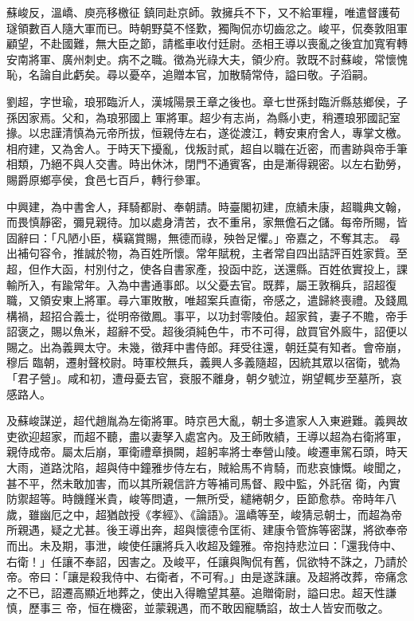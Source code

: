 \begin{pinyinscope}
 蘇峻反，溫嶠、庾亮移檄征
 鎮同赴京師。敦擁兵不下，又不給軍糧，唯遣督護荀璲領數百人隨大軍而已。時朝野莫不怪歎，獨陶侃亦切齒忿之。峻平，侃奏敦阻軍顧望，不赴國難，無大臣之節，請檻車收付廷尉。丞相王導以喪亂之後宜加寬宥轉安南將軍、廣州刺史。病不之職。徵為光祿大夫，領少府。敦既不討蘇峻，常懷愧恥，名論自此虧矣。尋以憂卒，追贈本官，加散騎常侍，謚曰敬。子滔嗣。



 劉超，字世瑜，琅邪臨沂人，漢城陽景王章之後也。章七世孫封臨沂縣慈鄉侯，子孫因家焉。父和，為琅邪國上
 軍將軍。超少有志尚，為縣小吏，稍遷琅邪國記室掾。以忠謹清慎為元帝所拔，恒親侍左右，遂從渡江，轉安東府舍人，專掌文檄。相府建，又為舍人。于時天下擾亂，伐叛討貳，超自以職在近密，而書跡與帝手筆相類，乃絕不與人交書。時出休沐，閉門不通賓客，由是漸得親密。以左右勤勞，賜爵原鄉亭侯，食邑七百戶，轉行參軍。



 中興建，為中書舍人，拜騎都尉、奉朝請。時臺閣初建，庶績未康，超職典文翰，而畏慎靜密，彌見親待。加以處身清苦，衣不重帛，家無儋石之儲。每帝所賜，皆固辭曰：「凡陋小臣，橫竊賞賜，無德而祿，殃咎足懼。」帝嘉之，不奪其志。
 尋出補句容令，推誠於物，為百姓所懷。常年賦稅，主者常自四出詰評百姓家貲。至超，但作大函，村別付之，使各自書家產，投函中訖，送還縣。百姓依實投上，課輸所入，有踰常年。入為中書通事郎。以父憂去官。既葬，屬王敦稱兵，詔超復職，又領安東上將軍。尋六軍敗散，唯超案兵直衛，帝感之，遣歸終喪禮。及錢鳳構禍，超招合義士，從明帝徵鳳。事平，以功封零陵伯。超家貧，妻子不贍，帝手詔褒之，賜以魚米，超辭不受。超後須純色牛，市不可得，啟買官外廄牛，詔便以賜之。出為義興太守。未幾，徵拜中書侍郎。拜受往還，朝廷莫有知者。會帝崩，穆后
 臨朝，遷射聲校尉。時軍校無兵，義興人多義隨超，因統其眾以宿衛，號為「君子營」。咸和初，遭母憂去官，衰服不離身，朝夕號泣，朔望輒步至墓所，哀感路人。



 及蘇峻謀逆，超代趙胤為左衛將軍。時京邑大亂，朝士多遣家人入東避難。義興故吏欲迎超家，而超不聽，盡以妻孥入處宮內。及王師敗績，王導以超為右衛將軍，親侍成帝。屬太后崩，軍衛禮章損闕，超躬率將士奉營山陵。峻遷車駕石頭，時天大雨，道路沈陷，超與侍中鐘雅步侍左右，賊給馬不肯騎，而悲哀慷慨。峻聞之，甚不平，然未敢加害，而以其所親信許方等補司馬督、殿中監，外託宿
 衛，內實防禦超等。時饑饉米貴，峻等問遺，一無所受，繾綣朝夕，臣節愈恭。帝時年八歲，雖幽厄之中，超猶啟授《孝經》、《論語》。溫嶠等至，峻猜忌朝士，而超為帝所親遇，疑之尤甚。後王導出奔，超與懷德令匡術、建康令管旆等密謀，將欲奉帝而出。未及期，事泄，峻使任讓將兵入收超及鐘雅。帝抱持悲泣曰：「還我侍中、右衛！」任讓不奉詔，因害之。及峻平，任讓與陶侃有舊，侃欲特不誅之，乃請於帝。帝曰：「讓是殺我侍中、右衛者，不可宥。」由是遂誅讓。及超將改葬，帝痛念之不已，詔遷高顯近地葬之，使出入得瞻望其墓。追贈衛尉，謚曰忠。超天性謙慎，歷事三
 帝，恒在機密，並蒙親遇，而不敢因寵驕諂，故士人皆安而敬之。




\end{pinyinscope}
